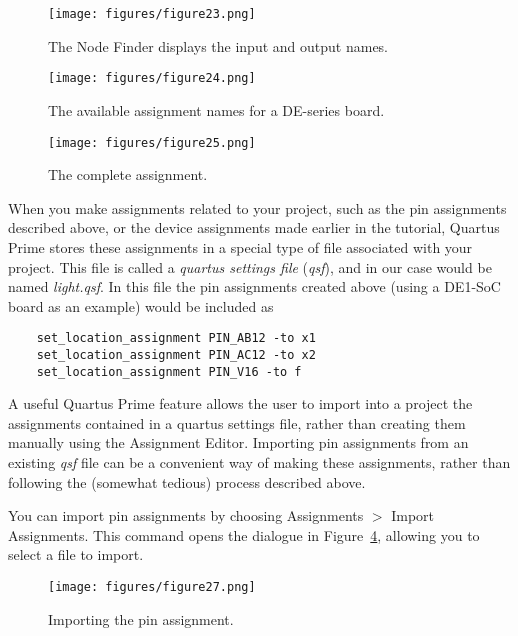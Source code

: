 \begin{figure}[H]
   \begin{center}
      \texttt{[image: figures/figure23.png]}
   \caption{The Node Finder displays the input and output names.} 
	 \label{fig:23}
	 \end{center}
\end{figure}

\begin{figure}[H]
   \begin{center}
      \texttt{[image: figures/figure24.png]}
   \caption{The available assignment names for a DE-series board.} 
	 \label{fig:24}
	 \end{center}
\end{figure}

\begin{figure}[H]
   \begin{center}
      \texttt{[image: figures/figure25.png]}
   \caption{The complete assignment.} 
	 \label{fig:25}
	 \end{center}
\end{figure}

When you make assignments related to your project, such as the pin assignments described
above, or the device assignments made earlier in the tutorial, Quartus Prime stores these 
assignments in a special type of file associated with your project. This file is called 
a {\it quartus settings file} ({\it qsf}), and in our case would be named {\it light.qsf}. 
In this file the pin assignments created above (using a DE1-SoC board as an example) would
be included as

\begin{center}
\begin{verbatim}
	set_location_assignment PIN_AB12 -to x1
	set_location_assignment PIN_AC12 -to x2
	set_location_assignment PIN_V16 -to f
\end{verbatim}
\end{center}

A useful Quartus Prime feature allows the user to import into a project the assignments
contained in a quartus settings file, rather than creating them manually using the 
Assignment Editor.  Importing pin assignments from an existing {\it qsf} file can be a
convenient way of making these assignments, rather than following the (somewhat tedious)
process described above.   

\noindent
You can import pin assignments by choosing {\sf Assignments $>$ Import Assignments}. 
This command opens the dialogue in Figure~\ref{fig:27}, allowing you to select a file to import. 
 
\begin{figure}[H]
   \begin{center}
      \texttt{[image: figures/figure27.png]}
   \caption{Importing the pin assignment.} 
	 \label{fig:27}
	 \end{center}
\end{figure}
